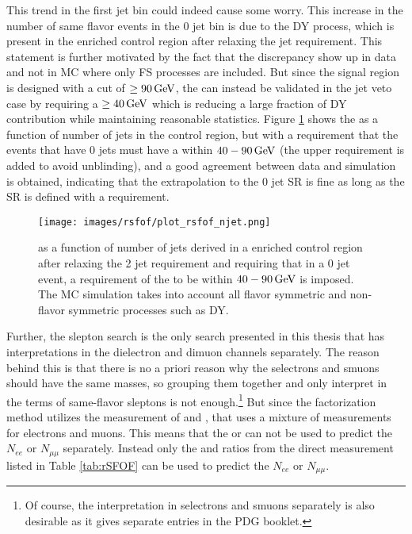This trend in the first jet bin could indeed cause some worry.
This increase in the number of same flavor events in the 0 jet bin is due to the DY process, which is present in the \ttbar enriched control region after relaxing the jet requirement.
This statement is further motivated by the fact that the discrepancy show up in data and not in MC where only FS processes are included.
But since the signal region is designed with a cut of \mttwo$\geq90\,\text{Ge\hspace{-.08em}V}$, the \Rsfof can instead be validated in the jet veto case by requiring a \mttwo$\geq40\,\text{Ge\hspace{-.08em}V}$ which is reducing a large fraction of DY contribution while maintaining reasonable statistics.
Figure \ref{fig:rsfofSleptonTwo} shows the \Rsfof as a function of number of jets in the \ttbar control region, but with a requirement that the events that have 0 jets must have a \mttwo within $40-90\,\text{Ge\hspace{-.08em}V}$ (the upper requirement is added to avoid unblinding), and a good agreement between data and simulation is obtained, indicating that the extrapolation to the 0 jet SR is fine as long as the SR is defined with a \mttwo requirement.
\begin{figure}[htbp!]
\begin{center}
    \texttt{[image: images/rsfof/plot\_rsfof\_njet.png]}
\caption{\Rsfof as a function of number of jets derived in a \ttbar enriched control region after relaxing the 2 jet requirement and requiring that in a 0 jet event, a requirement of the \mttwo to be     within $40-90\,\text{Ge\hspace{-.08em}V}$ is imposed. The MC simulation takes into account all flavor symmetric and non-flavor symmetric processes such as DY.}
\label{fig:rsfofSleptonTwo}
\end{center}
\end{figure}
\newpara
\noindent\justify
Further, the slepton search is the only search presented in this thesis that has interpretations in the dielectron and dimuon channels separately.
The reason behind this is that there is no a priori reason why the selectrons and smuons should have the same masses, so grouping them together and only interpret in the terms of same-flavor sleptons is not enough.\footnote{Of course, the interpretation in selectrons and smuons separately is also desirable as it gives separate entries in the PDG booklet. }
But since the factorization method utilizes the measurement of \rmue and \RT, that uses a mixture of measurements for electrons and muons.
This means that the \rmue or \RT can not be used to predict the $N_{ee}$ or $N_{\mu\mu}$ separately.
Instead only the \Reeof and \Rmmof ratios from the direct measurement listed in Table \ref{tab:rSFOF} can be used to predict the $N_{ee}$ or $N_{\mu\mu}$.
